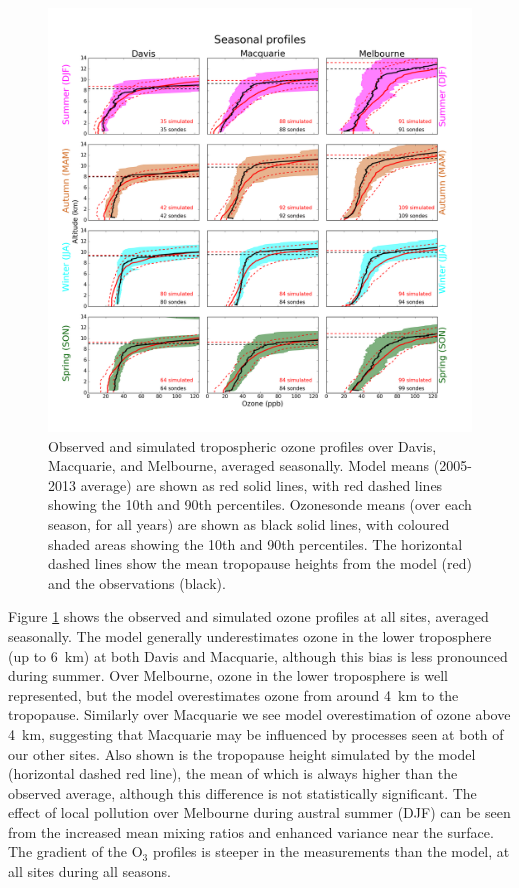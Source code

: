 \documentclass[acp, manuscript]{copernicus} %
\begin{document}
  \begin{figure}
    \includegraphics[width=14.0cm]{figures/seasonalprofiles00.png}
    \caption{%
      Observed and simulated tropospheric ozone profiles over Davis, Macquarie, and Melbourne, averaged seasonally.
      Model means (2005-2013 average) are shown as red solid lines, with red dashed lines showing the 10th and 90th percentiles.
      Ozonesonde means (over each season, for all years) are shown as black solid lines, with coloured shaded areas showing the 10th and 90th percentiles.
      The horizontal dashed lines show the mean tropopause heights from the model (red) and the observations (black).}
    \label{fig:GEOSChemSeasonalProfiles}
  \end{figure}
  
  Figure \ref{fig:GEOSChemSeasonalProfiles} shows the observed and simulated ozone profiles at all sites, averaged seasonally.
  The model generally underestimates ozone in the lower troposphere (up to 6~km) at both Davis and Macquarie, although this bias is less pronounced during summer.
  Over Melbourne, ozone in the lower troposphere is well represented, but the model overestimates ozone from around 4~km to the tropopause.
  Similarly over Macquarie we see model overestimation of ozone above 4~km, suggesting that Macquarie may be influenced by processes seen at both of our other sites.
  Also shown is the tropopause height simulated by the model (horizontal dashed red line), the mean of which is always higher than the observed average, although this difference is not statistically significant.
  The effect of local pollution over Melbourne during austral summer (DJF) can be seen from the increased mean mixing ratios and enhanced variance near the surface.
  The gradient of the O$_3$ profiles is steeper in the measurements than the model, at all sites during all seasons.
  
\end{document}

